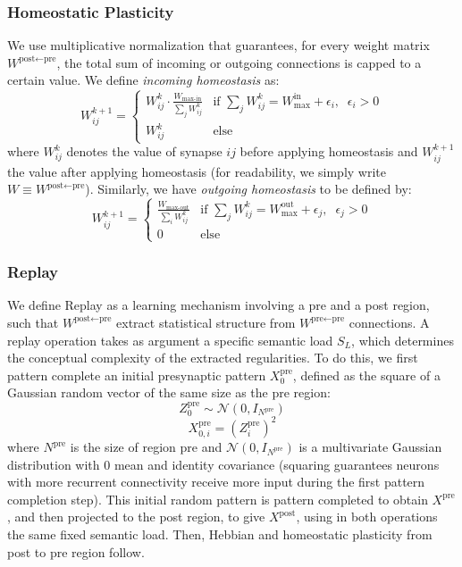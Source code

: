 \documentclass{article}
\begin{document}
\subsubsection*{Homeostatic Plasticity}
We use multiplicative normalization that guarantees, for every weight matrix $W^{\textrm{post}\leftarrow\textrm{pre}}$, the total sum of incoming or outgoing connections is capped to a certain value. We define \textit{incoming homeostasis} as:
\begin{equation}
W_{ij}^{k+1}=
\begin{cases}
 W_{ij}^{k}\cdot\frac{W_\textrm{max-in}}{\sum_{j}W^{k}_{ij}} & \text{if }\sum_{j}W^{k}_{ij} = W_\textrm{max}^\textrm{in} + \epsilon_i, \;\; \epsilon_i > 0 \\[1.2ex]
W^k_{ij}& \textrm{else}
\end{cases}
\label{incoming_homeostasis}
\end{equation}
where $W^k_{ij}$ denotes the value of synapse $ij$ before applying homeostasis and $W^{k+1}_{ij}$ the value after applying homeostasis (for readability, we simply write $W \equiv W^{\textrm{post}\leftarrow\textrm{pre}}$).
Similarly, we have \textit{outgoing homeostasis} to be defined by:
\begin{equation}
W_{ij}^{k+1} =
\begin{cases}
 \frac{W_\textrm{max-out}}{\sum_{i}W^k_{ij}} & \text{if }\sum_{j}W^k_{ij} = W_\textrm{max}^\textrm{out} + \epsilon_j, \;\; \epsilon_j > 0 \\[1.2ex]
0 & \textrm{else}
\end{cases}
\label{eq:outgoing_homeostasis}
\end{equation}
\subsubsection*{Replay}
We define \textrm{Replay} as a learning mechanism involving a pre and a post region, such that $W^{\textrm{post}\leftarrow\textrm{pre}}$ extract statistical structure from $W^{\textrm{pre}\leftarrow\textrm{pre}}$ connections. A replay operation takes as argument a specific semantic load $S_L$, which determines the conceptual complexity of the extracted regularities. To do this, we first pattern complete an initial presynaptic pattern $X^\textrm{pre}_0$, defined as the square of a Gaussian random vector of the same size as the pre region:
\begin{equation}
    Z_0^\textrm{pre} \sim \mathcal{N}(0, I_{N^\textrm{pre}})
\end{equation}
\begin{equation}
    X^\textrm{pre}_{0, i} = (Z^\textrm{pre}_i)^2
\end{equation}
where $N^\textrm{pre}$ is the size of region pre and $\mathcal{N}(0, I_{N^\textrm{pre}})$ is a multivariate Gaussian distribution with 0 mean and identity covariance (squaring guarantees neurons with more recurrent connectivity receive more input during the first pattern completion step). This initial random pattern is pattern completed to obtain $X^\textrm{pre}$, and then projected to the post region, to give $X^\textrm{post}$, using in both operations the same fixed semantic load. Then, Hebbian and homeostatic plasticity from post to pre region follow.
\clearpage
\end{document}
